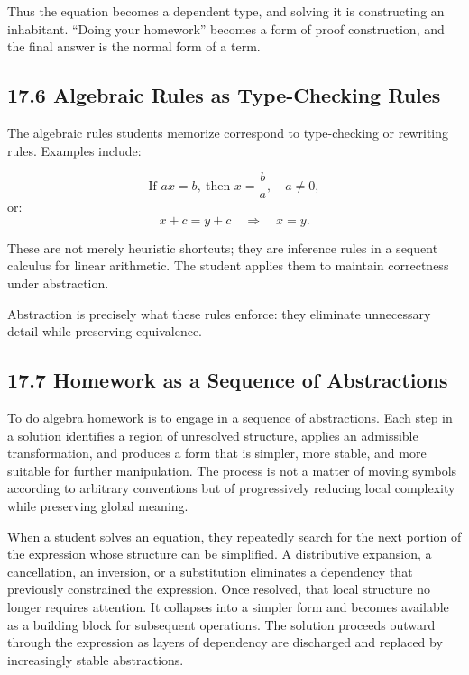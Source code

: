 \documentclass[12pt,letterpaper]{article}
\theoremstyle{remark}
\begin{document}
Thus the equation becomes a dependent type, and solving it is constructing an inhabitant. ``Doing your homework'' becomes a form of proof construction, and the final answer is the normal form of a term.

\subsection{17.6 Algebraic Rules as Type-Checking Rules}

The algebraic rules students memorize correspond to type-checking or rewriting rules. Examples include:

\[
\text{If } ax = b,\ \text{then } x = \frac{b}{a}, \quad a \neq 0,
\]
or:
\[
x + c = y + c \quad \Rightarrow \quad x = y.
\]

These are not merely heuristic shortcuts; they are inference rules in a sequent calculus for linear arithmetic. The student applies them to maintain correctness under abstraction.

Abstraction is precisely what these rules enforce: they eliminate unnecessary detail while preserving equivalence.

\subsection{17.7 Homework as a Sequence of Abstractions}

To do algebra homework is to engage in a sequence of abstractions. Each step in a solution identifies a region of unresolved structure, applies an admissible transformation, and produces a form that is simpler, more stable, and more suitable for further manipulation. The process is not a matter of moving symbols according to arbitrary conventions but of progressively reducing local complexity while preserving global meaning.

When a student solves an equation, they repeatedly search for the next portion of the expression whose structure can be simplified. A distributive expansion, a cancellation, an inversion, or a substitution eliminates a dependency that previously constrained the expression. Once resolved, that local structure no longer requires attention. It collapses into a simpler form and becomes available as a building block for subsequent operations. The solution proceeds outward through the expression as layers of dependency are discharged and replaced by increasingly stable abstractions.
\end{document}
